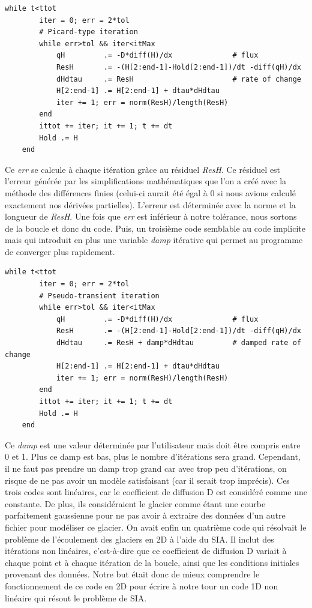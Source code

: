 \documentclass{article}
\begin{document}
\begin{verbatim}
while t<ttot
        iter = 0; err = 2*tol
        # Picard-type iteration
        while err>tol && iter<itMax
            qH         .= -D*diff(H)/dx              # flux
            ResH       .= -(H[2:end-1]-Hold[2:end-1])/dt -diff(qH)/dx
            dHdtau     .= ResH                       # rate of change
            H[2:end-1] .= H[2:end-1] + dtau*dHdtau   
            iter += 1; err = norm(ResH)/length(ResH)
        end
        ittot += iter; it += 1; t += dt
        Hold .= H
    end
\end{verbatim}
Ce \textit{err} se calcule à chaque itération gràce au résiduel \textit{ResH}. Ce résiduel est l'erreur générée par les simplifications mathématiques que l'on a créé avec la méthode des différences finies (celui-ci aurait été égal à 0 si nous avions calculé exactement nos dérivées partielles). L'erreur est déterminée avec la norme et la longueur de \textit{ResH}. Une fois que \textit{err} est inférieur à notre tolérance, nous sortons de la boucle et donc du code.
\newline
\newline
 Puis, un troisième code semblable au code implicite mais qui introduit en plus une variable \textit{damp} itérative qui permet au programme de converger plus rapidement.
\begin{verbatim}
while t<ttot
        iter = 0; err = 2*tol
        # Pseudo-transient iteration
        while err>tol && iter<itMax
            qH         .= -D*diff(H)/dx              # flux
            ResH       .= -(H[2:end-1]-Hold[2:end-1])/dt -diff(qH)/dx
            dHdtau     .= ResH + damp*dHdtau         # damped rate of change
            H[2:end-1] .= H[2:end-1] + dtau*dHdtau   
            iter += 1; err = norm(ResH)/length(ResH)
        end
        ittot += iter; it += 1; t += dt
        Hold .= H
    end
\end{verbatim}
Ce \textit{damp} est une valeur déterminée par l'utilisateur mais doit être compris entre 0 et 1. Plus ce damp est bas, plus le nombre d'itérations sera grand. Cependant, il ne faut pas prendre un damp trop grand car avec trop peu d'itérations, on risque de ne pas avoir un modèle satisfaisant (car il serait trop imprécis).
\newpage
Ces trois codes sont linéaires, car le coefficient de diffusion D est considéré comme une constante. De plus, ils considéraient le glacier comme étant une courbe parfaitement gaussienne pour ne pas avoir à extraire des données d'un autre fichier pour modéliser ce glacier.
\newline
\newline
On avait enfin un quatrième code qui résolvait le problème de l'écoulement des glaciers en 2D à l'aide du SIA. Il inclut des itérations non linéaires, c'est-à-dire que ce coefficient de diffusion D variait à chaque point et à chaque itération de la boucle, ainsi que les conditions initiales provenant des données. 
\newline
Notre but était donc de mieux comprendre le fonctionnement de ce code en 2D pour écrire à notre tour un code 1D non linéaire qui résout le problème de SIA.
\newpage
\end{document}
